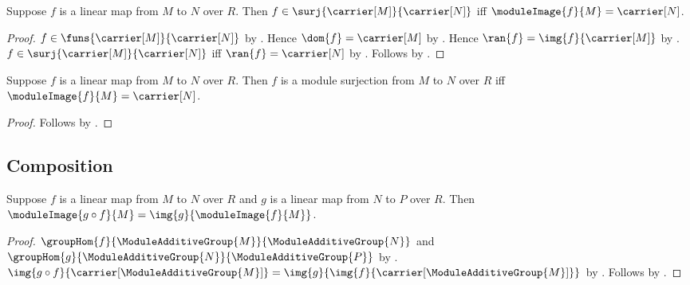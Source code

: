 \begin{theorem}\label{linear_map_surjective_iff_image_full}
    Suppose $f$ is a linear map from $M$ to $N$ over $R$.
    Then $f\in\surj{\carrier[M]}{\carrier[N]}$ iff
        $\moduleImage{f}{M}=\carrier[N]$.
\end{theorem}
\begin{proof}
    $f\in\funs{\carrier[M]}{\carrier[N]}$ by
        .
    Hence $\dom{f}=\carrier[M]$ by .
    Hence $\ran{f}=\img{f}{\carrier[M]}$ by .
    $f\in\surj{\carrier[M]}{\carrier[N]}$ iff
        $\ran{f}=\carrier[N]$ by .
    Follows by .
\end{proof}

\begin{corollary}\label{module_surjection_iff_image_full}
    Suppose $f$ is a linear map from $M$ to $N$ over $R$.
    Then $f$ is a module surjection from $M$ to $N$ over $R$ iff
        $\moduleImage{f}{M}=\carrier[N]$.
\end{corollary}
\begin{proof}
    Follows by
        .
\end{proof}

\subsection{Composition}

\begin{theorem}\label{module_image_composition}
    Suppose $f$ is a linear map from $M$ to $N$ over $R$ and
        $g$ is a linear map from $N$ to $P$ over $R$.
    Then
        $\moduleImage{g\circ f}{M}
            =\img{g}{\moduleImage{f}{M}}$.
\end{theorem}
\begin{proof}
    $\groupHom{f}{\ModuleAdditiveGroup{M}}{
        \ModuleAdditiveGroup{N}}$ and
        $\groupHom{g}{\ModuleAdditiveGroup{N}}{
        \ModuleAdditiveGroup{P}}$ by
        .
    $\img{g\circ f}{\carrier[\ModuleAdditiveGroup{M}]}
        =\img{g}{\img{f}{\carrier[\ModuleAdditiveGroup{M}]}}$ by
        .
    Follows by
        .
\end{proof}

